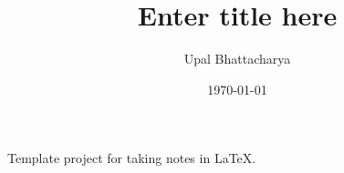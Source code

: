 \documentclass[a4paper,colorinlistoftodos]{article}
\author{Upal Bhattacharya}
\date{\today}
\title{Enter title here}
\begin{document}
\maketitle

\begingroup
    \hypersetup{linkcolor=black}
    \tableofcontents
    \pagebreak
\endgroup

\linenumbers

Template project for taking notes in \LaTeX.




\pagebreak
\nolinenumbers
\appendix

\begingroup
    \hypersetup{linkcolor=black}
    \listoftodos
    \listofchanges
    \pagebreak
\endgroup
\end{document}
